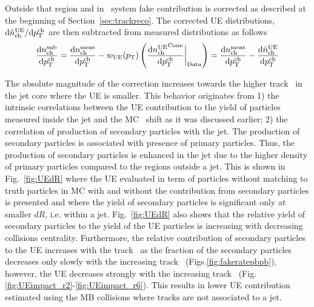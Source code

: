 Outside that region and in \pp\ system fake contribution is corrected as described at the beginning of Section~\ref{sec:trackreco}.  The corrected UE distributions, $\mathrm{d} \mbox{$\tilde{n}_{\mathrm{ch}}^{\mathrm{UE}}$} / \mathrm{d} \mbox{$p_{{\mathrm{T}}}^{\mathrm{ch}}$}$ are then subtracted from measured distributions as follows
 \begin{eqnarray}
 \label{eq:Dptsub}
\frac{\mathrm{d} n_{\mathrm{ch}}^{\mathrm{sub}}}{\mathrm{d} \mbox{$p_{{\mathrm{T}}}^{\mathrm{ch}}$}}  = \frac{\mathrm{d} n_{\mathrm{ch}}^{\mathrm{meas}}}{\mathrm{d} \mbox{$p_{{\mathrm{T}}}^{\mathrm{ch}}$}} - {w_{\mathrm{UE}} (p_{\mathrm{T}})} \left( \frac{\mathrm{d} \mbox{$n_{\mathrm{ch}}^{\mathrm{UE}}$}^{\mathrm{Cone}}}{\mathrm{d} \mbox{$p_{{\mathrm{T}}}^{\mathrm{ch}}$}} \bigg|_{\mathrm{Data}} \right)  = \frac{\mathrm{d} n_{\mathrm{ch}}^{\mathrm{meas}}}{\mathrm{d} \mbox{$p_{{\mathrm{T}}}^{\mathrm{ch}}$}} - \frac{\mathrm{d} \mbox{$\tilde{n}_{\mathrm{ch}}^{\mathrm{UE}}$}}{\mathrm{d} \mbox{$p_{{\mathrm{T}}}^{\mathrm{ch}}$}}
 \end{eqnarray}

The absolute magnitude of the correction increases towards the higher track \pt\ in the jet core where the UE is smaller. This behavior originates from 1) the intrinsic correlations between the UE contribution to the yield of particles measured inside the jet and the MC \pTjet\ shift as it was discussed earlier; 2) the correlation of production of secondary particles with the jet.  The production of secondary particles is associated with presence of primary particles. Thus, the production of secondary particles is enhanced in the jet due to the higher density of primary particles compared to the regions outside a jet. This is shown in Fig.~\ref{fig:UEdR} where the UE evaluated in term of particles without matching to truth particles in MC with and without the contribution from secondary particles is presented and where the yield of secondary particles is significant only at smaller $dR$, i.e. within a jet.  Fig.~\ref{fig:UEdR} also shows that the relative yield of secondary particles to the yield of the UE particles is increasing with decreasing collisions centrality. Furthermore, the relative contribution of secondary particles to the UE increases with the track \pT\ as the fraction of the secondary particles decreases only slowly with the increasing track \pT\ (Figs.\ref{fig:fakeratepbpb}), however, the UE decreases strongly with the increasing track \pT\ (Fig.\ref{fig:UEimpact_r2}-\ref{fig:UEimpact_r6}). This results in lower UE contribution estimated using the MB collisions where tracks are not associated to a jet.

     

